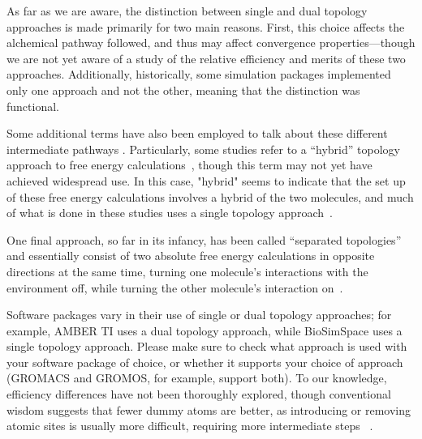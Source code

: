 \documentclass[9pt,bestpractices,pubversion]{livecoms}
\begin{document}
As far as we are aware, the distinction between single and dual topology approaches is made primarily for two main reasons. First, this choice affects the alchemical pathway followed, and thus may affect convergence properties---though we are not yet aware of a study of the relative efficiency and merits of these two approaches. Additionally, historically, some simulation packages implemented only one approach and not the other, meaning that the distinction was functional. 

Some additional terms have also been employed to talk about these different intermediate pathways . Particularly, some studies refer to a ``hybrid'' topology approach to free energy calculations~\cite{gapsys2015pmx, gapsys2016accurate, gapsys2020large}, though this term may not yet have achieved widespread use. In this case, "hybrid" seems to indicate that the set up of these free energy calculations involves a hybrid of the two molecules, and much of what is done in these studies uses a single topology approach~\cite{gapsys2020large}.

One final approach, so far in its infancy, has been called ``separated topologies'' and essentially consist of two absolute free energy calculations in opposite directions at the same time, turning one molecule's interactions with the environment off, while turning the other molecule's interaction on~\cite{jiang2019computing, rocklin2013separated}.

Software packages vary in their use of single or dual topology approaches; for example, AMBER TI uses a dual topology approach, while BioSimSpace uses a single topology approach. Please make sure to check what approach is used with your software package of choice, or whether it supports your choice of approach (GROMACS and GROMOS, for example, support both). 
To our knowledge, efficiency differences have not been thoroughly explored, though conventional wisdom suggests that fewer dummy atoms are better, as introducing or removing atomic sites is usually more difficult, requiring more intermediate steps ~\cite{liu2013lead, mobley2012perspective}.
\end{document}
